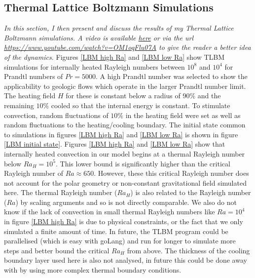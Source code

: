 \documentclass{article}
\begin{document}
\subsection*{Thermal Lattice Boltzmann Simulations}
{\it{In this section, I then present and discuss the results of my Thermal Lattice Boltzmann simulations. A video is available \href{https://www.youtube.com/watch?v=OM1oqFlu07A}{here} or via the url \url{https://www.youtube.com/watch?v=OM1oqFlu07A} to give the reader a better idea of the dynamics.}}
\vspace{0.3cm}
\newline
Figures \ref{LBM high Ra} and \ref{LBM low Ra} show TLBM simulations for internally heated Rayleigh 
numbers between $10^8$ and $10^4$ for Prandtl numbers of $Pr=5000$. A high Prandtl number was selected to show the applicability to geologic flows which operate in the larger Prandtl number limit. The heating field $H$ for these is constant below a radius of $90 \%$ and the 
remaining $10\%$ cooled so that the internal energy is constant. To stimulate convection, random fluctuations of $10 \%$ in the heating field were set as well as random fluctuations to the heating/cooling boundary. The initial state common to simulations in figures \ref{LBM high Ra} and \ref{LBM low Ra} is shown in figure \ref{LBM initial state}. 
\newline
\noindent Figures \ref{LBM high Ra} and \ref{LBM low Ra} show that internally heated convection in our model begins at a thermal Rayleigh number below 
$Ra_H=10^5$. This lower bound is significantly higher than the critical Rayleigh number of $Ra\approx650$. However, these this critical Rayleigh number does not 
account for the polar geometry or non-constant gravitational field simulated here. The thermal Rayleigh number ($Ra_H$) is also related to the Rayleigh 
number ($Ra$) by scaling arguments and so is not directly comparable. We also do not know if the lack of convection in small thermal Rayleigh numbers 
like $Ra=10^4$ in figure \ref{LBM high Ra} is due to physical constraints, or the fact that we only simulated a finite amount of time. In future, the 
TLBM program could be parallelised (which is easy with goLang) and run for longer to simulate more steps and better bound the critical $Ra_H$ from above. The thickness of the cooling boundary layer used here is also not analysed, in future this could be done away with by using more complex thermal boundary conditions.  
\end{document}
